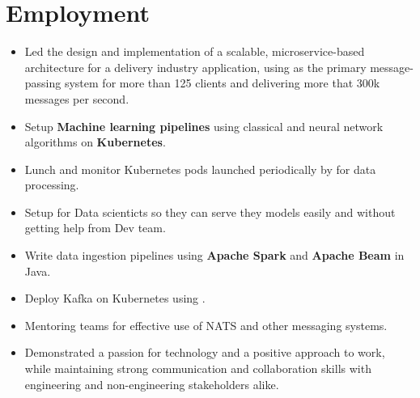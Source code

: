 \section{Employment}

\vspace{0.5cm}
\begin{itemize}
  \item Led the design and implementation of a scalable, microservice-based architecture for a delivery industry application,
    using  as the primary message-passing system for more than 125 clients and delivering
    more that 300k messages per second.
  \item Setup \textbf{Machine learning pipelines} using classical and neural network algorithms on \textbf{Kubernetes}.
  \item Lunch and monitor Kubernetes pods launched periodically by  for data processing.
  \item Setup  for Data scienticts so they can serve they models easily and without getting help from Dev team.
  \item Write data ingestion pipelines using \textbf{Apache Spark} and \textbf{Apache Beam} in Java.
  \item Deploy Kafka on Kubernetes using .
  \item Mentoring teams for effective use of NATS and other messaging systems.
  \item Demonstrated a passion for technology and a positive approach to work,
    while maintaining strong communication and collaboration skills with engineering
    and non-engineering stakeholders alike.
\end{itemize}

\vspace{1cm}

